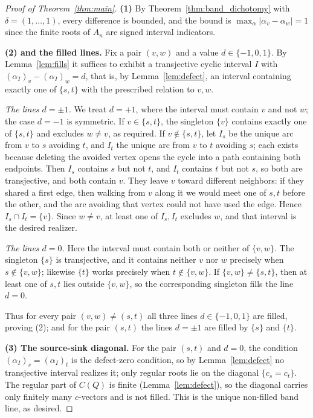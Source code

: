 \documentclass[11pt, a4paper]{amsart}
\theoremstyle{definition}
\begin{document}
\begin{proof}[Proof of Theorem~\ref{thm:main}]
\textbf{(1)}\; By Theorem~\ref{thm:band_dichotomy} with
$\delta = (1, \dots, 1)$, every difference is bounded, and the bound is
$\max_\alpha |\alpha_v - \alpha_w| = 1$ since the finite roots of $A_n$
are signed interval indicators.

\textbf{(2) and the filled lines.}\; Fix a pair $(v, w)$ and a value
$d \in \{-1, 0, 1\}$. By Lemma~\ref{lem:fills} it suffices to exhibit a
transjective cyclic interval $I$ with $(\alpha_I)_v - (\alpha_I)_w = d$,
that is, by Lemma~\ref{lem:defect}, an interval containing exactly one of
$\{s, t\}$ with the prescribed relation to $v, w$.

\emph{The lines $d = \pm 1$.} We treat $d = +1$, where the interval must
contain $v$ and not $w$; the case $d = -1$ is symmetric. If
$v \in \{s, t\}$, the singleton $\{v\}$ contains exactly one of
$\{s, t\}$ and excludes $w \neq v$, as required. If $v \notin \{s, t\}$,
let $I_s$ be the unique arc from $v$ to $s$ avoiding $t$, and $I_t$ the
unique arc from $v$ to $t$ avoiding $s$; each exists because deleting the
avoided vertex opens the cycle into a path containing both endpoints.
Then $I_s$ contains $s$ but not $t$, and $I_t$ contains $t$ but not $s$,
so both are transjective, and both contain $v$. They leave $v$ toward
different neighbors: if they shared a first edge, then walking from $v$
along it we would meet one of $s, t$ before the other, and the arc avoiding
that vertex could not have used the edge. Hence $I_s \cap I_t = \{v\}$.
Since $w \neq v$, at least one of $I_s, I_t$ excludes $w$, and that interval
is the desired realizer.

\emph{The lines $d = 0$.} Here the interval must contain both or neither
of $\{v, w\}$. The singleton $\{s\}$ is transjective, and it contains
neither $v$ nor $w$ precisely when $s \notin \{v, w\}$; likewise $\{t\}$
works precisely when $t \notin \{v, w\}$. If $\{v, w\} \neq \{s, t\}$,
then at least one of $s, t$ lies outside $\{v, w\}$, so the corresponding
singleton fills the line $d = 0$.

Thus for every pair $(v, w) \neq (s, t)$ all three lines $d \in
\{-1, 0, 1\}$ are filled, proving (2); and for the pair $(s, t)$ the
lines $d = \pm 1$ are filled by $\{s\}$ and $\{t\}$.

\textbf{(3) The source-sink diagonal.}\; For the pair $(s, t)$ and
$d = 0$, the condition $(\alpha_I)_s = (\alpha_I)_t$ is the defect-zero
condition, so by Lemma~\ref{lem:defect} no transjective interval realizes
it; only regular roots lie on the diagonal $\{c_s = c_t\}$. The regular
part of $C(Q)$ is finite (Lemma~\ref{lem:defect}), so the diagonal
carries only finitely many $c$-vectors and is not filled. This is the
unique non-filled band line, as desired.
\end{proof}
\end{document}
